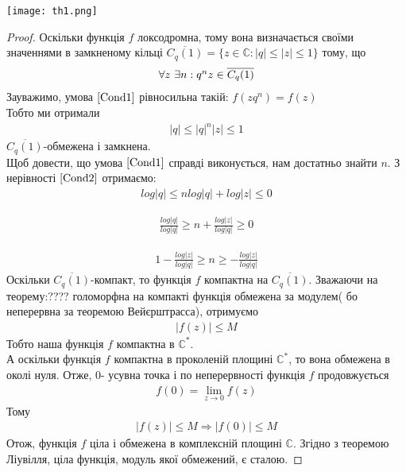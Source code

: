 \documentclass[12pt,a4paper]{article}
\begin{document}
\texttt{[image: th1.png]}
\begin{proof}
Оскільки функція $f$ локсодромна, тому вона визначається своїми значеннями в замкненому кільці $\overline{C_{q}(1)}=\lbrace z\in \mathbb{C}: \vert q\vert\leq\vert z\vert\leq 1\rbrace$ \label{C_{q}(1)} тому, що 
\begin{equation}\label{Cond1}
\begin{array}{l}
 \forall z $ $\exists n: q^{n}z \in \overline{C_{q}(1)} 
\end{array}
\end{equation} 
Зауважимо, умова $\eqref{Cond1}$ рівносильна такій: $f(zq^{n})=f(z)$\\
Тобто ми отримали
\begin{equation}\label{Cond2}
\begin{array}{l}
\vert q \vert \leq \vert q\vert ^{n} \vert z\vert \leq 1                       
\end{array}
\end{equation}
$\overline{C_{q}(1)}$-обмежена і замкнена.\\
Щоб довести, що умова  $\eqref{Cond1}$ справді виконується, нам достатньо знайти $n$. З нерівності $\eqref{Cond2}$ отримаємо:
\[\begin{array}{l}
log\vert q \vert \leq n log\vert q\vert +log \vert z\vert \leq 0                       
\end{array}\]

\[\begin{array}{l}
\frac {log\vert q \vert }{log\vert q\vert} \geq n  + \frac{ log \vert z\vert}{log\vert q\vert} \geq 0                       
\end{array}\]

\[\begin{array}{l}
1- \frac{ log \vert z\vert}{log\vert q\vert} \geq n  \geq -\frac{ log \vert z\vert}{log\vert q\vert} 
\end{array}\]
Оскільки $\overline{C_{q}(1)}$-компакт, то функція $f$ компактна на $\overline{C_{q}(1)}$. Зважаючи на теорему:???? голоморфна на компакті функція обмежена за модулем( бо неперервна за теоремою Вейєрштрасса), отримуємо
\[\begin{array}{l}
  \vert f(z) \vert\leq M
\end{array}\]
Тобто наша функція $f$ компактна в $\mathbb{C}^{*}$. \\
А оскільки функція $f$ компактна в проколеній площині $\mathbb{C}^{*}$, то вона обмежена в околі нуля. Отже, $0$- усувна точка і по неперервності функція $f$ продовжується
\[\begin{array}{l}
  f(0)=\lim\limits_{z\rightarrow 0} f(z)
\end{array}\]
Тому 
\[\begin{array}{l}
  \vert f(z) \vert\leq M \Longrightarrow \vert f(0) \vert\leq M
\end{array}\]
Отож, функція $f$ ціла і обмежена в комплексній площині $\mathbb{C}$. Згідно з теоремою Ліувілля, ціла функція, модуль якої обмежений, є сталою.
\end{proof}
\vspace{1,5cm}
\end{document}
